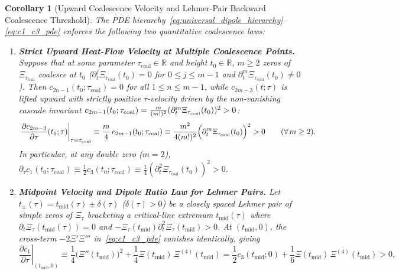 \documentclass[11pt,reqno]{amsart}
\newtheorem{corollary}[theorem]{Corollary}
\theoremstyle{definition}
\theoremstyle{remark}
\numberwithin{equation}{section}
\newcommand{\R}{\mathbb{R}}
\newcommand{\fac}{\mathclose{\mathchar"0021}}
\begin{document}
\begin{corollary}[Upward Coalescence Velocity and Lehmer-Pair Backward Coalescence Threshold]\label{cor:lehmer_coalescence}
The PDE hierarchy~\eqref{eq:universal_dipole_hierarchy}--\eqref{eq:c1_c3_pde} enforces the following two quantitative coalescence laws:
\begin{enumerate}[label=\textup{(\roman*)},leftmargin=2.2em]
\item \textbf{Strict Upward Heat-Flow Velocity at Multiple Coalescence Points.} Suppose that at some parameter $\tau_{\mathrm{coal}} \in \R$ and height $t_0 \in \R$, $m \ge 2$ zeros of $\Xi_{\tau_{\mathrm{coal}}}$ coalesce at $t_0$ ($\partial_t^j\Xi_{\tau_{\mathrm{coal}}}(t_0) = 0$ for $0 \le j \le m-1$ and $\partial_t^m\Xi_{\tau_{\mathrm{coal}}}(t_0) \neq 0$). Then $c_{2n-1}(t_0;\tau_{\mathrm{coal}}) = 0$ for all $1 \le n \le m-1$, while $c_{2m-3}(t;\tau)$ is lifted upward with strictly positive $\tau$-velocity driven by the non-vanishing cascade invariant $c_{2m-1}(t_0;\tau_{\mathrm{coal}}) = \frac{m}{(m\fac)^2}(\partial_t^m\Xi_{\tau_{\mathrm{coal}}}(t_0))^2 > 0$:
\begin{equation}\label{eq:mfold_coalescence_lift}
\left.\frac{\partial c_{2m-3}}{\partial\tau}(t_0;\tau)\right|_{\tau=\tau_{\mathrm{coal}}} \equiv \frac{m}{4}\,c_{2m-1}(t_0;\tau_{\mathrm{coal}}) \equiv \frac{m^2}{4(m\fac)^2}\Bigl(\partial_t^m\Xi_{\tau_{\mathrm{coal}}}(t_0)\Bigr)^2 > 0 \qquad (\forall\, m \ge 2).
\end{equation}
In particular, at any double zero ($m = 2$), $\partial_\tau c_1(t_0;\tau_{\mathrm{coal}}) \equiv \frac{1}{2}c_3(t_0;\tau_{\mathrm{coal}}) \equiv \frac{1}{4}(\partial_t^2\Xi_{\tau_{\mathrm{coal}}}(t_0))^2 > 0$.
\item \textbf{Midpoint Velocity and Dipole Ratio Law for Lehmer Pairs.} Let $t_\pm(\tau) = t_{\mathrm{mid}}(\tau) \pm \delta(\tau)$ ($\delta(\tau) > 0$) be a closely spaced Lehmer pair of simple zeros of $\Xi_\tau$ bracketing a critical-line extremum $t_{\mathrm{mid}}(\tau)$ where $\partial_t\Xi_\tau(t_{\mathrm{mid}}(\tau)) = 0$ and $-\Xi_\tau(t_{\mathrm{mid}})\partial_t^2\Xi_\tau(t_{\mathrm{mid}}) > 0$. At $(t_{\mathrm{mid}}, 0)$, the cross-term $-2\Xi'\Xi'''$ in~\eqref{eq:c1_c3_pde} vanishes identically, giving
\begin{equation}\label{eq:lehmer_midpoint_lift}
\left.\frac{\partial c_1}{\partial\tau}\right|_{(t_{\mathrm{mid}},0)} \equiv \frac{1}{4}\bigl(\Xi''(t_{\mathrm{mid}})\bigr)^2 + \frac{1}{4}\Xi(t_{\mathrm{mid}})\,\Xi^{(4)}(t_{\mathrm{mid}}) = \frac{1}{2}c_3(t_{\mathrm{mid}};0) + \frac{1}{6}\Xi(t_{\mathrm{mid}})\,\Xi^{(4)}(t_{\mathrm{mid}}) > 0,

\end{equation}
\end{enumerate}
\end{corollary}
\end{document}
